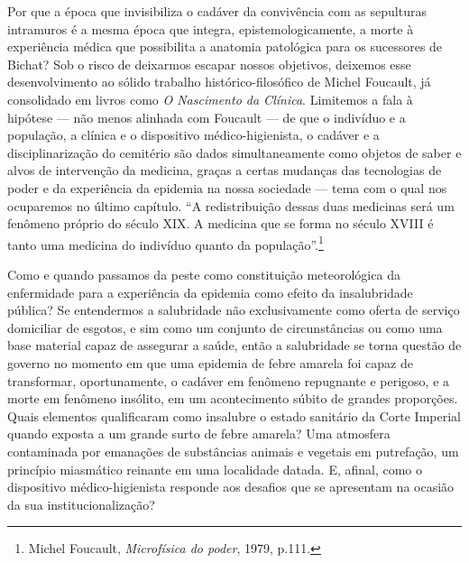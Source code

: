 Por que a época que invisibiliza o cadáver da convivência com as
sepulturas intramuros é a mesma época que integra, epistemologicamente,
a morte à experiência médica que possibilita a anatomia patológica para
os sucessores de Bichat? Sob o risco de deixarmos escapar nossos
objetivos, deixemos esse desenvolvimento ao sólido trabalho
histórico-filosófico de Michel Foucault, já consolidado em livros como
\textit{O Nascimento da Clínica}. Limitemos a fala à hipótese --- não menos
alinhada com Foucault --- de que o indivíduo e a população, a clínica e o
dispositivo médico-higienista, o cadáver e a disciplinarização do
cemitério são dados simultaneamente como objetos de saber e alvos de
intervenção da medicina, graças a certas mudanças das tecnologias de
poder e da experiência da epidemia na nossa sociedade --- tema com o qual
nos ocuparemos no último capítulo. ``A redistribuição dessas duas
medicinas será um fenômeno próprio do século XIX. A medicina que se
forma no século XVIII é tanto uma medicina do indivíduo quanto da
população''.\footnote{Michel Foucault, \textit{Microfísica do poder},
  1979, p.111.}

Como e quando passamos da peste como constituição meteorológica da
enfermidade para a experiência da epidemia como efeito da insalubridade
pública? Se entendermos a salubridade não exclusivamente como oferta de
serviço domiciliar de esgotos, e sim como um conjunto de circunstâncias
ou como uma base material capaz de assegurar a saúde, então a
salubridade se torna questão de governo no momento em que uma epidemia
de febre amarela foi capaz de transformar, oportunamente, o cadáver em
fenômeno repugnante e perigoso, e a morte em fenômeno insólito, em um
acontecimento súbito de grandes proporções. Quais elementos qualificaram
como insalubre o estado sanitário da Corte Imperial quando exposta a um
grande surto de febre amarela? Uma atmosfera contaminada por emanações
de substâncias animais e vegetais em putrefação, um princípio miasmático
reinante em uma localidade datada. E, afinal, como o dispositivo
médico-higienista responde aos desafios que se apresentam na ocasião da
sua institucionalização?

